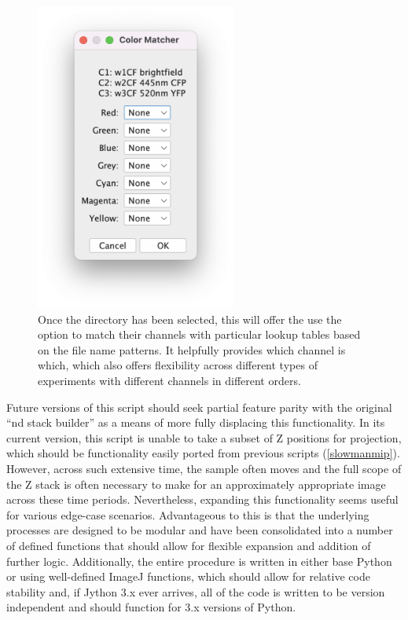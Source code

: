 \begin{figure}
\centering
\includegraphics[height=4in]{images/colormatcher.png}
\caption[Second part of the GUI for metamorpher, allowing the user to select the false colors for the different image channels]{Once the directory has been selected, this will offer the use the option to match their channels with particular lookup tables based on the file name patterns. It helpfully provides which channel is which, which also offers flexibility across different types of experiments with different channels in different orders.}
\label{figure:metacolormatcher}
\end{figure}

Future versions of this script should seek partial feature parity with the original ``nd stack builder'' as a means of more fully displacing this functionality. In its current version, this script is unable to take a subset of Z positions for projection, which should be functionality easily ported from previous scripts (\autoref{slowmanmip}). However, across such extensive time, the sample often moves and the full scope of the Z stack is often necessary to make for an approximately appropriate image across these time periods. Nevertheless, expanding this functionality seems useful for various edge-case scenarios. Advantageous to this is that the underlying processes are designed to be modular and have been consolidated into a number of defined functions that should allow for flexible expansion and addition of further logic. Additionally, the entire procedure is written in either base Python or using well-defined ImageJ functions, which should allow for relative code stability and, if Jython 3.x ever arrives, all of the code is written to be version independent and should function for 3.x versions of Python.

